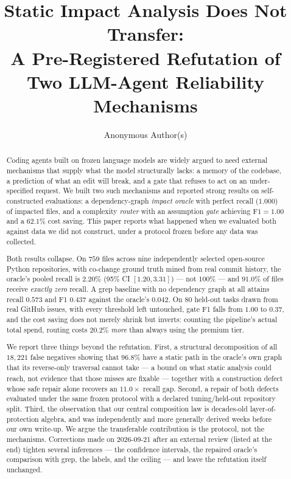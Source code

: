 \documentclass[sigconf,review,anonymous]{acmart}
\newcommand{\corr}{\textsuperscript{\dag}}
\begin{document}
\title{Static Impact Analysis Does Not Transfer:\\A Pre-Registered Refutation of Two LLM-Agent Reliability Mechanisms}

\author{Anonymous Author(s)}

\begin{abstract}
Coding agents built on frozen language models are widely argued to need external
mechanisms that supply what the model structurally lacks: a memory of the codebase, a
prediction of what an edit will break, and a gate that refuses to act on an
under-specified request. We built two such mechanisms and reported strong results on
self-constructed evaluations: a dependency-graph \emph{impact oracle} with perfect recall
($1.000$) of impacted files, and a complexity \emph{router} with an assumption
\emph{gate} achieving $\mathrm{F1}=1.00$ and a $62.1\%$ cost saving. This paper reports
what happened when we evaluated both against data we did not construct, under a protocol
frozen before any data was collected.

Both results collapse. On $759$ files across nine independently selected open-source
Python repositories, with co-change ground truth mined from real commit history, the
oracle's pooled recall is $2.20\%$ (95\% CI $[1.20, 3.31]$) --- not $100\%$ --- and
$91.0\%$ of files receive \emph{exactly zero} recall. A grep baseline with no dependency
graph at all attains recall $0.573$ and F1 $0.437$ against the oracle's $0.042$. On $80$
held-out tasks drawn from real GitHub issues, with every threshold left untouched, gate
F1 falls from $1.00$ to $0.37$, and the cost saving does not merely shrink but inverts: counting the
pipeline's actual total spend, routing costs $20.2\%$ \emph{more} than always using the premium tier.

We report three things beyond the refutation. First, a structural decomposition of all
$18{,}221$ false negatives showing that $96.8\%$ have a static path in the oracle's own graph
that its reverse-only traversal cannot take --- a bound on what static analysis could reach, not
evidence that those misses are fixable\corr{} --- together with a construction defect whose safe
repair alone recovers an $11.0\times$ recall gap. Second, a repair of both defects evaluated
under the same frozen protocol with a declared tuning/held-out repository split. Third,
the observation that our central composition law is decades-old layer-of-protection
algebra, and was independently and more generally derived weeks before our own write-up.
We argue the transferable contribution is the protocol, not the mechanisms.
Corrections made on 2026-09-21 after an external review (listed at the end) tighten several
inferences --- the confidence intervals, the repaired oracle's comparison with grep, the labels,
and the ceiling --- and leave the refutation itself unchanged.
\end{abstract}
\end{document}
